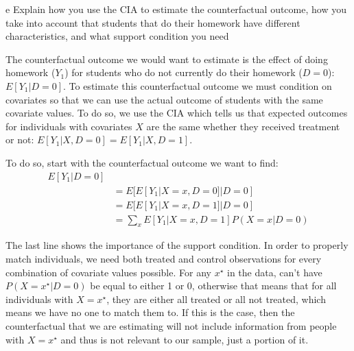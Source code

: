 \documentclass{article}
\begin{document}
\begin{problem}{e}
Explain how you use the CIA to estimate the counterfactual outcome, how you take into account that students that do their homework have different characteristics, and what support condition you need
\end{problem}
\begin{solution}
The counterfactual outcome we would want to estimate is the effect of doing homework ($Y_1$) for students who do not currently do their homework ($D=0$): $E[Y_1|D=0]$. To estimate this counterfactual outcome we must condition on covariates so that we can use the actual outcome of students with the same covariate values. To do so, we use the CIA which tells us that expected outcomes for individuals with covariates $X$ are the same whether they received treatment or not: $E[Y_1|X,D=0]=E[Y_1|X,D=1]$.

To do so, start with the counterfactual outcome we want to find:
\begin{align}
    E[Y_1|D=0] & \tag{Counterfactual outcome} \\
    &=E[ E[Y_1| X=x, D=0] | D=0] \tag{Expand inside using LIE} \\
    &=E[ E[Y_1| X=x, D=1] | D=0] \tag{Use CIA} \\
    &= \sum_{x} E[Y_1 | X=x, D=1] P(X=x|D=0) \tag{Outer E[$\cdot$] as weighted sum}
\end{align}

The last line shows the importance of the support condition. In order to properly match individuals, we need both treated and control observations for every combination of covariate values possible. For any $x^\star$ in the data, can't have $P(X=x^\star|D=0)$ be equal to either 1 or 0, otherwise that means that for all individuals with $X=x^\star$, they are either all treated or all not treated, which means we have no one to match them to. If this is the case, then the counterfactual that we are estimating will not include information from people with $X=x^\star$ and thus is not relevant to our sample, just a portion of it.

\end{solution}
\end{document}
